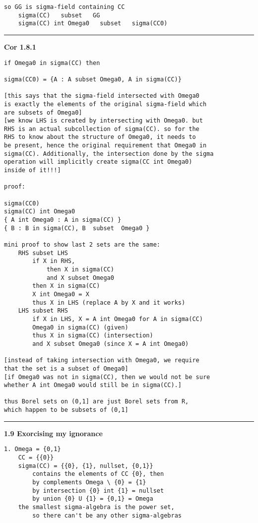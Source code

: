 \documentclass{article}
\begin{document}
\begin{flushleft}
\begin{verbatim}
so GG is sigma-field containing CC
    sigma(CC)   subset   GG
    sigma(CC) int Omega0   subset   sigma(CC0)
\end{verbatim}


\bigbreak
\hrule
\bigbreak
\textbf{Cor 1.8.1}

\begin{verbatim}
if Omega0 in sigma(CC) then 

sigma(CC0) = {A : A subset Omega0, A in sigma(CC)}

[this says that the sigma-field intersected with Omega0
is exactly the elements of the original sigma-field which
are subsets of Omega0]
[we know LHS is created by intersecting with Omega0. but 
RHS is an actual subcollection of sigma(CC). so for the 
RHS to know about the structure of Omega0, it needs to 
be present, hence the original requirement that Omega0 in 
sigma(CC). Additionally, the intersection done by the sigma
operation will implicitly create sigma(CC int Omega0) 
inside of it!!!]

proof:

sigma(CC0)
sigma(CC) int Omega0
{ A int Omega0 : A in sigma(CC) }
{ B : B in sigma(CC), B  subset  Omega0 }    

mini proof to show last 2 sets are the same:
    RHS subset LHS 
        if X in RHS, 
            then X in sigma(CC) 
            and X subset Omega0 
        then X in sigma(CC)
        X int Omega0 = X 
        thus X in LHS (replace A by X and it works)
    LHS subset RHS
        if X in LHS, X = A int Omega0 for A in sigma(CC)
        Omega0 in sigma(CC) (given)
        thus X in sigma(CC) (intersection)
        and X subset Omega0 (since X = A int Omega0)

[instead of taking intersection with Omega0, we require 
that the set is a subset of Omega0]
[if Omega0 was not in sigma(CC), then we would not be sure 
whether A int Omega0 would still be in sigma(CC).]

thus Borel sets on (0,1] are just Borel sets from R, 
which happen to be subsets of (0,1]
\end{verbatim}

\bigbreak
\hrule
\bigbreak
\textbf{1.9 Exorcising my ignorance}

\begin{verbatim}
1. Omega = {0,1}
    CC = {{0}}
    sigma(CC) = {{0}, {1}, nullset, {0,1}}
        contains the elements of CC {0}, then 
        by complements Omega \ {0} = {1}
        by intersection {0} int {1} = nullset 
        by union {0} U {1} = {0,1} = Omega
    the smallest sigma-algebra is the power set,
        so there can't be any other sigma-algebras 


\end{verbatim}
\end{flushleft}
\end{document}
